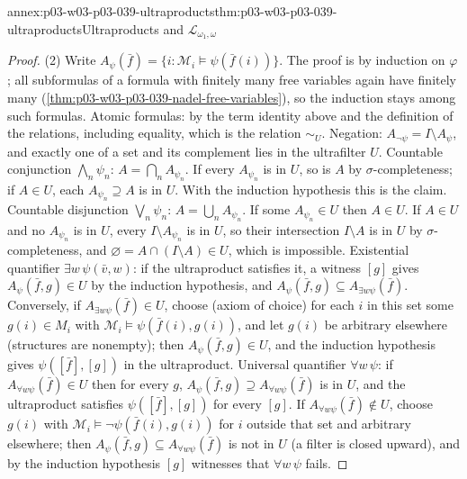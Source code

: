 \begin{annexitem}{annex:p03-w03-p03-039-ultraproducts}{thm:p03-w03-p03-039-ultraproducts}{Ultraproducts and \(\mathcal L_{\omega_1,\omega}\)}
\begin{proof}
(2) Write \(A_\psi(\bar f)=\{i:\mathcal M_i\models\psi(\bar f(i))\}\). The
proof is by induction on \(\varphi\); all subformulas of a formula with
finitely many free variables again have finitely many
(\cref{thm:p03-w03-p03-039-nadel-free-variables}), so the induction stays
among such formulas. Atomic formulas: by the term identity above and the
definition of the relations, including equality, which is the relation
\(\sim_U\). Negation: \(A_{\neg\psi}=I\setminus A_\psi\), and exactly one of a
set and its complement lies in the ultrafilter \(U\). Countable conjunction
\(\bigwedge_{n}\psi_n\): \(A=\bigcap_nA_{\psi_n}\). If every \(A_{\psi_n}\) is
in \(U\), so is \(A\) by \(\sigma\)-completeness; if \(A\in U\), each
\(A_{\psi_n}\supseteq A\) is in \(U\). With the induction hypothesis this is
the claim. Countable disjunction \(\bigvee_n\psi_n\): \(A=\bigcup_nA_{\psi_n}\).
If some \(A_{\psi_n}\in U\) then \(A\in U\). If \(A\in U\) and no
\(A_{\psi_n}\) is in \(U\), every \(I\setminus A_{\psi_n}\) is in \(U\), so
their intersection \(I\setminus A\) is in \(U\) by \(\sigma\)-completeness,
and \(\varnothing=A\cap(I\setminus A)\in U\), which is impossible. Existential
quantifier \(\exists w\,\psi(\bar v,w)\): if the ultraproduct satisfies it, a
witness \([g]\) gives \(A_\psi(\bar f,g)\in U\) by the induction hypothesis,
and \(A_\psi(\bar f,g)\subseteq A_{\exists w\psi}(\bar f)\). Conversely, if
\(A_{\exists w\psi}(\bar f)\in U\), choose (axiom of choice) for each \(i\) in
this set some \(g(i)\in M_i\) with \(\mathcal M_i\models\psi(\bar f(i),g(i))\),
and let \(g(i)\) be arbitrary elsewhere (structures are nonempty); then
\(A_\psi(\bar f,g)\in U\), and the induction hypothesis gives
\(\psi([\bar f],[g])\) in the ultraproduct. Universal quantifier
\(\forall w\,\psi\): if \(A_{\forall w\psi}(\bar f)\in U\) then for every
\(g\), \(A_\psi(\bar f,g)\supseteq A_{\forall w\psi}(\bar f)\) is in \(U\),
and the ultraproduct satisfies \(\psi([\bar f],[g])\) for every \([g]\). If
\(A_{\forall w\psi}(\bar f)\notin U\), choose \(g(i)\) with
\(\mathcal M_i\models\neg\psi(\bar f(i),g(i))\) for \(i\) outside that set and
arbitrary elsewhere; then \(A_\psi(\bar f,g)\subseteq A_{\forall w\psi}(\bar f)\)
is not in \(U\) (a filter is closed upward), and by the induction hypothesis
\([g]\) witnesses that \(\forall w\,\psi\) fails.
\end{proof}
\end{annexitem}

